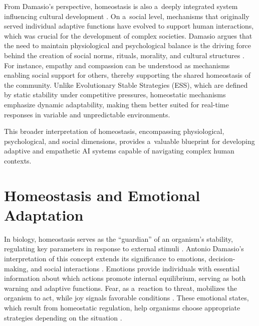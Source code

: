 \documentclass[%
  manuscript=article,
  year=2024,
  volume=77,
  doi=00000.000,
]{zfn}
\begin{document}
From Damasio's perspective, homeostasis is also a~deeply integrated system influencing cultural development 
\parencites[][]{klos_neuron_2014}[][]{damasio_strange_2018}. %
 On a~social level, mechanisms that originally served individual adaptive functions have evolved to support human interactions, which was crucial for the development of complex societies. Damasio argues that the need to maintain physiological and psychological balance is the driving force behind the creation of social norms, rituals, morality, and cultural structures 
\parencite[][]{damasio_strange_2018}. %
 For instance, empathy and compassion can be understood as mechanisms enabling social support for others, thereby supporting the shared homeostasis of the community. Unlike Evolutionary Stable Strategies (ESS), which are defined by static stability under competitive pressures, homeostatic mechanisms emphasize dynamic adaptability, making them better suited for real-time responses in variable and unpredictable environments.



This broader interpretation of homeostasis, encompassing physiological, psychological, and social dimensions, provides a~valuable blueprint for developing adaptive and empathetic AI systems capable of navigating complex human contexts.



\section*{Homeostasis and Emotional Adaptation}

In biology, homeostasis serves as the ``guardian'' of an organism's stability, regulating key parameters in response to external stimuli 
\parencites[][]{giordano_homeostasis_2013}[][]{davies_adaptive_2016}. %
 Antonio Damasio's interpretation of this concept extends its significance to emotions, decision-making, and social interactions 
\parencite[][]{damasio_homeostatic_2022}. %
 Emotions provide individuals with essential information about which actions promote internal equilibrium, serving as both warning and adaptive functions. Fear, as a~reaction to threat, mobilizes the organism to act, while joy signals favorable conditions 
\parencite[][]{piolopez_advances_2023}. %
 These emotional states, which result from homeostatic regulation, help organisms choose appropriate strategies depending on the situation 
\parencite[][]{goldstein_how_2019}.%
~
\end{document}
